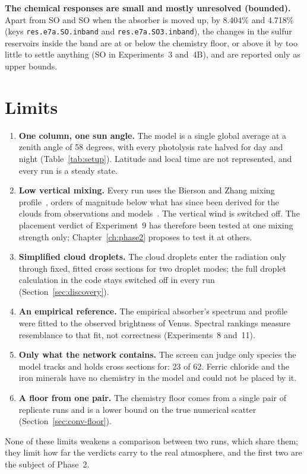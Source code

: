 \textbf{The chemical responses are small and mostly unresolved (bounded).} Apart from SO
and SO when the absorber is moved up, by 8.404\% and 4.718\% (keys
\texttt{res.e7a.SO.inband} and \texttt{res.e7a.SO3.inband}), the changes in the sulfur
reservoirs inside the band are at or below the chemistry floor, or above it by too little
to settle anything (SO in Experiments~3 and~4B), and are reported only as upper bounds.

\section{Limits}
\label{sec:limits}

\begin{enumerate}[leftmargin=*, itemsep=2pt]
  \item \textbf{One column, one sun angle.} The model is a single global average at a
    zenith angle of 58 degrees, with every photolysis rate halved for day and night
    (Table~\ref{tab:setup}). Latitude and local time are not represented, and every run
    is a steady state.
  \item \textbf{Low vertical mixing.} Every run uses the Bierson and Zhang mixing
    profile~\cite{bierson2020}, orders of magnitude below what has since been derived
    for the clouds from observations and models~\cite{dai2023kzz, lefevre2024}. The vertical wind is switched off. The
    placement verdict of Experiment~9 has therefore been tested at one mixing strength
    only; Chapter~\ref{ch:phase2} proposes to test it at others.
  \item \textbf{Simplified cloud droplets.} The cloud droplets enter the radiation only
    through fixed, fitted cross sections for two droplet modes; the full droplet
    calculation in the code stays switched off in every run
    (Section~\ref{sec:discovery}).
  \item \textbf{An empirical reference.} The empirical absorber's spectrum and profile
    were fitted to the observed brightness of Venus. Spectral rankings measure resemblance
    to that fit, not correctness (Experiments~8 and~11).
  \item \textbf{Only what the network contains.} The screen can judge only species the
    model tracks and holds cross sections for: 23 of 62. Ferric chloride and the iron
    minerals have no chemistry in the model and could not be placed by it.
  \item \textbf{A floor from one pair.} The chemistry floor comes from a single pair of
    replicate runs and is a lower bound on the true numerical scatter
    (Section~\ref{sec:conv-floor}).
\end{enumerate}

None of these limits weakens a comparison between two runs, which share them; they
limit how far the verdicts carry to the real atmosphere, and the first two are the
subject of Phase~2.
